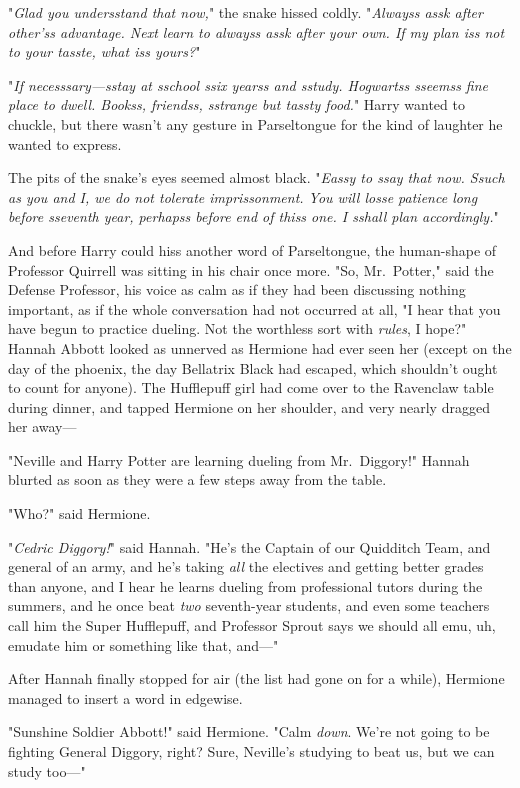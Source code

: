 "\emph{Glad you undersstand that now,}" the snake hissed coldly. "\emph{Alwayss 
assk after other'ss advantage. Next learn to alwayss assk after your own. If my 
plan iss not to your tasste, what iss yours?}"

"\emph{If necesssary---sstay at sschool ssix yearss and sstudy. Hogwartss 
sseemss fine place to dwell. Bookss, friendss, sstrange but tassty food.}" 
Harry wanted to chuckle, but there wasn't any gesture in Parseltongue for the 
kind of laughter he wanted to express.

The pits of the snake's eyes seemed almost black. "\emph{Eassy to ssay that 
now. Ssuch as you and I, we do not tolerate imprissonment. You will losse 
patience long before sseventh year, perhapss before end of thiss one. I sshall 
plan accordingly.}"

And before Harry could hiss another word of Parseltongue, the human-shape of 
Professor Quirrell was sitting in his chair once more. "So, Mr.~Potter," said 
the Defense Professor, his voice as calm as if they had been discussing nothing 
important, as if the whole conversation had not occurred at all, "I hear that 
you have begun to practice dueling. Not the worthless sort with \emph{rules}, I 
hope?"
\sbreak
Hannah Abbott looked as unnerved as Hermione had ever seen her (except on the 
day of the phoenix, the day Bellatrix Black had escaped, which shouldn't ought 
to count for anyone). The Hufflepuff girl had come over to the Ravenclaw table 
during dinner, and tapped Hermione on her shoulder, and very nearly dragged her 
away---

"Neville and Harry Potter are learning dueling from Mr.~Diggory!" Hannah 
blurted as soon as they were a few steps away from the table.

"Who?" said Hermione.

"\emph{Cedric Diggory!}" said Hannah. "He's the Captain of our Quidditch Team, 
and general of an army, and he's taking \emph{all} the electives and getting 
better grades than anyone, and I hear he learns dueling from professional 
tutors during the summers, and he once beat \emph{two} seventh-year students, 
and even some teachers call him the Super Hufflepuff, and Professor Sprout says 
we should all emu, uh, emudate him or something like that, and---"

After Hannah finally stopped for air (the list had gone on for a while), 
Hermione managed to insert a word in edgewise.

"Sunshine Soldier Abbott!" said Hermione. "Calm \emph{down}. We're not going to 
be fighting General Diggory, right? Sure, Neville's studying to beat us, but we 
can study too---"

